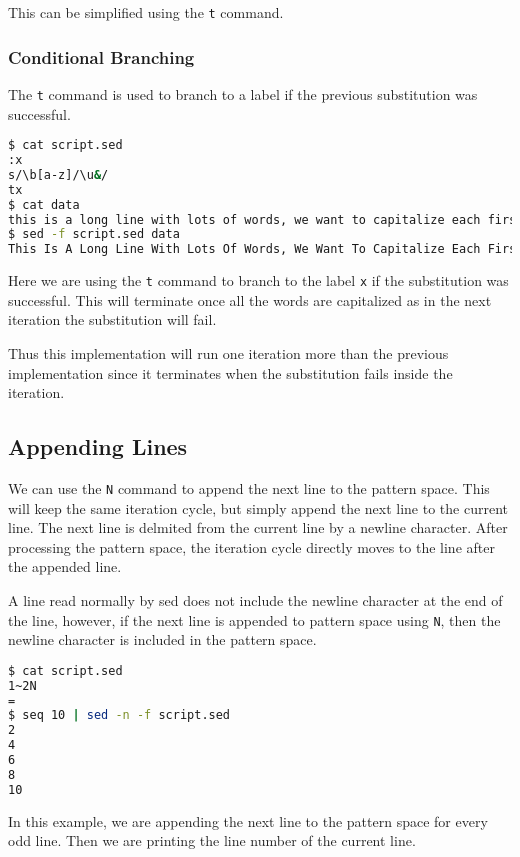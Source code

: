 This can be simplified using the \lstinline|t| command.

\subsubsection{Conditional Branching}

The \lstinline|t| command is used to branch to a label if the previous substitution was successful.

\begin{lstlisting}[language=bash]
$ cat script.sed
:x
s/\b[a-z]/\u&/
tx
$ cat data
this is a long line with lots of words, we want to capitalize each first letter of a word.
$ sed -f script.sed data
This Is A Long Line With Lots Of Words, We Want To Capitalize Each First Letter Of A Word.
\end{lstlisting}

Here we are using the \lstinline|t| command to branch to the label \lstinline|x| if the substitution was successful.
This will terminate once all the words are capitalized as in the next iteration the substitution will fail.

Thus this implementation will run one iteration more than the previous implementation since it terminates when the substitution fails inside the iteration.

\subsection{Appending Lines}

We can use the \lstinline|N| command to append the next line to the pattern space.
This will keep the same iteration cycle, but simply append the next line to the current line.
The next line is delmited from the current line by a newline character.
After processing the pattern space, the iteration cycle directly moves to the line after the appended line.

A line read normally by sed does not include the newline character at the end of the line, however, if the next line is appended to pattern space using
\lstinline|N|, then the newline character is included in the pattern space.

\begin{lstlisting}[language=bash]
$ cat script.sed
1~2N
=
$ seq 10 | sed -n -f script.sed
2
4
6
8
10
\end{lstlisting}

In this example, we are appending the next line to the pattern space for every odd line.
Then we are printing the line number of the current line.

